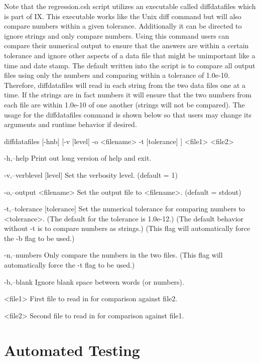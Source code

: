 Note that the regression.\+csh script utilizes an executable called diffdatafiles which is part of IX. This executable works like the Unix diff command but will also compare numbers within a given tolerance. Additionally it can be directed to ignore strings and only compare numbers. Using this command users can compare their numerical output to ensure that the answers are within a certain tolerance and ignore other aspects of a data file that might be unimportant like a time and date stamp. The default written into the script is to compare all output files using only the numbers and comparing within a tolerance of 1.\+0e-\/10. Therefore, diffdatafiles will read in each string from the two data files one at a time. If the strings are in fact numbers it will ensure that the two numbers from each file are within 1.\+0e-\/10 of one another (strings will not be compared). The usage for the diffdatafiles command is shown below so that users may change its arguments and runtime behavior if desired. \begin{DoxyVerb}    diffdatafiles [-hnb] [-v [level] -o <filename> -t [tolerance] ] <file1> <file2> 

    -h,--help
            Print out long version of help and exit.

    -v,--verblevel [level]
            Set the verbosity level. (default = 1)

    -o,--output <filename>
            Set the output file to <filename>. (default = stdout)

    -t,--tolerance [tolerance]
            Set the numerical tolerance for comparing numbers to <tolerance>.
            (The default for the tolerance is 1.0e-12.)
            (The default behavior without -t is to compare numbers as strings.)
            (This flag will automatically force the -b flag to be used.)

    -n,--numbers
            Only compare the numbers in the two files.
            (This flag will automatically force the -t flag to be used.)

    -b,--blank
            Ignore blank space between words (or numbers).

    <file1>
            First file to read in for comparison against file2.

    <file2>
            Second file to read in for comparison against file1.
\end{DoxyVerb}
\hypertarget{testingproject_guide_autotesting_sec}{}\section{Automated Testing}\label{testingproject_guide_autotesting_sec}
